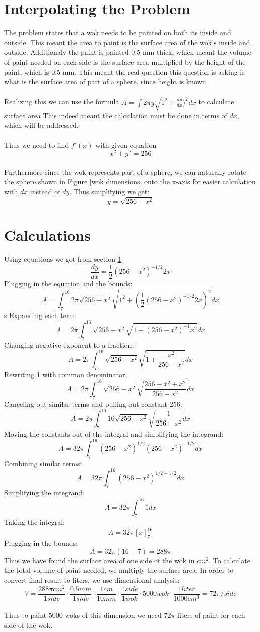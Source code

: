\documentclass[a4paper, 12pt]{article}
\begin{document}
	\section{Interpolating the Problem}
		\label{interpolation}
		The problem states that a wok needs to be painted on both its inside and outside. This meant the area to paint is the surface area of the wok's inside and outside. Additionaly the paint is painted 0.5 mm thick, which meant the volume of paint needed on each side is the surface area multiplied by the height of the paint, which is 0.5 mm. This meant the  real question this question is asking is what is the surface area of part of a sphere, since height is known.\\\\
		Realizing this we can use the formula $A = \int2\pi y\sqrt{1^2+\frac{dy}{dx})^2}dx$ to calculate surface area This indeed meant the calculation must be done in terms of $dx$, which will be addressed.\\\\
		 Thus we need to find $f'(x)$ with given equation $$x^2+y^2=256$$\\
		Furthermore since the wok represents part of a sphere, we can naturally rotate the sphere shown in Figure \ref{wok dimensions} onto the x-axis for easier calculation with $dx$ instead of $dy$. Thus simplifying we get:$$y=\sqrt{256-x^2}$$
	\section{Calculations} 
		Using equations we got from section \ref{interpolation}: $$\frac{dy}{dx}=\frac{1}{2}{(256-x^2)}^{-1/2} 2x$$
		Plugging in the equation and the bounds:$$A = \int_7^{16} 2\pi \sqrt{256-x^2}\sqrt{1^2+{(\frac{1}{2}{(256-x^2)}^{-1/2} 2x)}^2}dx$$s
		Expanding each term:$$A =2\pi \int_7^{16} \sqrt{256-x^2}\sqrt{1+{(256-x^2)}^{-1} x^2}dx$$
		Changing negative exponent to a fraction:$$A =2\pi \int_7^{16} \sqrt{256-x^2}\sqrt{1+\frac{x^2}{256-x^2}}dx$$
		Rewriting 1 with common denominator:$$A =2\pi \int_7^{16} \sqrt{256-x^2}\sqrt{\frac{256-x^2+x^2}{256-x^2}}dx$$
		Canceling out similar terms and pulling out constant 256:$$A =2\pi \int_7^{16} 16\sqrt{256-x^2} \sqrt{\frac{1}{256-x^2}}dx$$
		Moving the constants out of the integral and simplifying the integrand:$$A =32\pi \int_7^{16}{(256-x^2)}^{1/2} {(256-x^2)}^{-1/2}dx$$
		Combining similar terms:$$A =32\pi \int_7^{16}{(256-x^2)}^{1/2-1/2} dx$$
		Simplifying the integrand:$$A =32\pi \int_7^{16}1 dx$$
		Taking the integral:$$A =32\pi \left[x\right]_7^{16}$$
		Plugging in the bounds:$$A =32\pi {(16-7)}=288\pi$$
		Thus we have found the surface area of one side of the wok in $cm^2$. To calculate the total volume of paint needed, we multiply the surface area. In order to convert final result to liters, we use dimensional analysis:$$V=\frac{288\pi cm^2}{1 side}\cdot\frac{ 0.5 mm}{1 side} \cdot\frac{1 cm}{10 mm}\cdot\frac{1 side}{1 wok}\cdot5000 wok\cdot\frac{1 liter}{1000cm^3}=72\pi/side$$\\
		Thus to paint 5000 woks of this dimension we need $72\pi$ liters of paint for each side of the wok.
\end{document}
